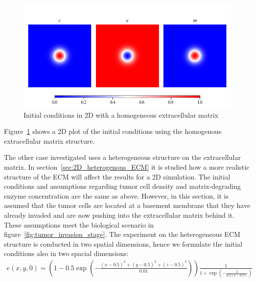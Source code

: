 \begin{figure}[ht!]
    \centering
    \includegraphics[width=\textwidth]{resources/images/2D_initial_conditions_homogenous_ECM.png}
    \caption{Initial conditions in 2D with a homogeneous extracellular matrix}
    \label{fig:2D_homogenous_ECM_initial}
\end{figure}
Figure~\ref{fig:2D_homogenous_ECM_initial} shows a 2D plot of the initial conditions using the homogenous extracellular matrix structure.

The other case investigated uses a heterogeneous structure on the extracellular matrix. In section~\ref{sec:2D_heterogenous_ECM} it is studied how a more realistic structure of the ECM will affect the results for a 2D simulation. The initial conditions and assumptions regarding tumor cell density and matrix-degrading enzyme concentration are the same as above. However, in this section, it is assumed that the tumor cells are located at a basement membrane that they have already invaded and are now pushing into the extracellular matrix behind it. These assumptions meet the biological scenario in figure~\ref{fig:tumor_invasion_stage}. The experiment on the heterogeneous ECM structure is conducted in two spatial dimensions, hence we formulate the initial conditions also in two spacial dimensions:
\begin{align*}
    e(x,y,0) = (1 - 0.5 \exp(-\frac{(x-0.5)^2+(y-0.5)^2+(z-0.5)^2}{0.01}))\frac{1}{1+\exp(-\frac{2}{0.1 (x-0.5)})}
\end{align*}

